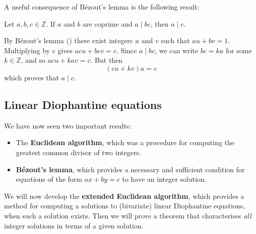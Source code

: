 A useful consequence of B\'{e}zout's lemma is the following result:

\begin{proposition}
\label{propADividesBC}
Let $a,b,c \in \mathbb{Z}$. If $a$ and $b$ are coprime and $a \mid bc$, then $a \mid c$.
\end{proposition}

\begin{cproof}
By B\'{e}zout's lemma () there exist integers $u$ and $v$ such that $au+bv=1$. Multiplying by $c$ gives $acu+bcv=c$. Since $a \mid bc$, we can write $bc=ka$ for some $k \in \mathbb{Z}$, and so $acu+kav=c$. But then \[ (cu+kv)a = c \] which proves that $a \mid c$.
\end{cproof}

\subsection*{Linear Diophantine equations}
We have now seen two important results:
\begin{itemize}
\item The \textbf{Euclidean algorithm}, which was a procedure for computing the greatest common divisor of two integers.
\item \textbf{B\'{e}zout's lemma}, which provides a necessary and sufficient condition for equations of the form $ax+by=c$ to have an integer solution.
\end{itemize}
We will now develop the \textbf{extended Euclidean algorithm}, which provides a method for computing a solutions to (bivariate) linear Diophantine equations, when such a solution exists. Then we will prove a theorem that characterises \textit{all} integer solutions in terms of a given solution.

